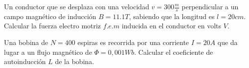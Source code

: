 \documentclass[./examen.tex]{subfiles}
\begin{document}
\begin{center}
\end{center}
\begin{questions}

 \question[5] Un conductor que se desplaza con una velocidad $v=300\frac{m}{s}$ perpendicular a un campo magnético de inducción $B=11.1T$, sabiendo que la longitud es $l=20cm$. Calcular la fuerza electro motriz $f.e.m$ inducida en el conductor en volts $V$.
 
 \begin{center}
 \end{center}
 
 \question[5]  Una bobina de $N=400$ espiras es recorrida por una corriente $I=20A$ que da lugar a un flujo magnético de $\Phi=0,001Wb$. Calcular el coeficiente de autoinducción $L$ de la bobina.
 \end{questions}

 
 
\end{document}
